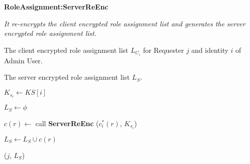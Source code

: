 \documentclass[epsfig,a4paper,11pt,titlepage]{book}
\numberwithin{algorithm}{chapter}
\newcommand{\algofontsize}{\fontsize{11}{12}\selectfont}
\begin{document}
\begin{algorithm} [htp]
{\algofontsize
\caption{\textbf{RoleAssignment:ServerReEnc}}

\label{algo:erbac-deploy-role-assignment-server-side}

\begin{algorithmic}[1]

\INPUT \emph{It re-encrypts the client encrypted role assignment list and generates the server encrypted role assignment list.}

\Require The client encrypted role assignment list $L_{C_i}$ for Requester $j$ and identity $i$ of Admin User.

\Ensure The server encrypted role assignment list $L_{S}$.

\medskip

\State $K_{s_i} \leftarrow KS[i]$ {\algofontsize {}} \label{line:erbac-deploy-ra-ss-ks}

\State $L_{S} \leftarrow \phi$ \label{line:erbac-deploy-ra-ss-init}

 \label{line:erbac-deploy-ra-ss-loop}

	\State $c(r) \leftarrow$ call \textbf{ServerReEnc} ($c^*_i (r)$, $K_{s_i}$) {\algofontsize {}} \label{line:erbac-deploy-ra-ss-call}
	
	\State $L_{S} \leftarrow L_{S} \cup c(r)$ \label{line:erbac-deploy-ra-ss-update}

\EndFor

\Return ($j$, $L_{S}$)

\end{algorithmic}
}
\end{algorithm}
\end{document}
